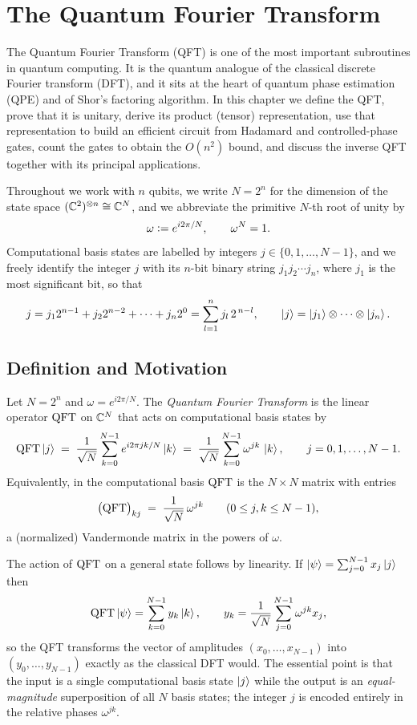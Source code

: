\chapter{The Quantum Fourier Transform}

The Quantum Fourier Transform (QFT) is one of the most important subroutines in
quantum computing. It is the quantum analogue of the classical discrete Fourier
transform (DFT), and it sits at the heart of quantum phase estimation (QPE) and
of Shor's factoring algorithm. In this chapter we define the QFT, prove that it
is unitary, derive its product (tensor) representation, use that representation
to build an efficient circuit from Hadamard and controlled-phase gates, count
the gates to obtain the $O(n^2)$ bound, and discuss the inverse QFT together
with its principal applications.

Throughout we work with $n$ qubits, we write $N = 2^n$ for the dimension of the
state space $(\mathbb{C}^2)^{\otimes n}\cong\mathbb{C}^N$, and we abbreviate the primitive
$N$-th root of unity by
\[
  \omega \vcentcolon= e^{i 2\pi / N}, \qquad \omega^N = 1 .
\]
Computational basis states are labelled by integers $j\in\{0,1,\dots,N-1\}$, and
we freely identify the integer $j$ with its $n$-bit binary string
$j_1 j_2 \cdots j_n$, where $j_1$ is the most significant bit, so that
\[
  j = j_1 2^{n-1} + j_2 2^{n-2} + \cdots + j_n 2^{0}
    = \sum_{l=1}^{n} j_l\, 2^{\,n-l},
  \qquad \ket{j} = \ket{j_1}\otimes\cdots\otimes\ket{j_n}.
\]

\section{Definition and Motivation}

\begin{definition}\label{l5:def:qft}
Let $N = 2^n$ and $\omega = e^{i 2\pi / N}$. The \emph{Quantum Fourier
Transform} is the linear operator $\mathrm{QFT}$ on $\mathbb{C}^N$ that acts on computational
basis states by
\[
  \mathrm{QFT}\ket{j} \;=\; \frac{1}{\sqrt N}\sum_{k=0}^{N-1} e^{i 2\pi j k / N}\ket{k}
             \;=\; \frac{1}{\sqrt N}\sum_{k=0}^{N-1} \omega^{jk}\,\ket{k},
  \qquad j = 0,1,\dots,N-1 .
\]
Equivalently, in the computational basis $\mathrm{QFT}$ is the $N\times N$ matrix with
entries
\[
  \bigl(\mathrm{QFT}\bigr)_{kj} \;=\; \frac{1}{\sqrt N}\,\omega^{jk}
  \qquad (0 \le j,k \le N-1),
\]
a (normalized) Vandermonde matrix in the powers of $\omega$.
\end{definition}

The action of $\mathrm{QFT}$ on a general state follows by linearity. If
$\ket{\psi} = \sum_{j=0}^{N-1} x_j \ket{j}$ then
\[
  \mathrm{QFT}\ket{\psi}
    = \sum_{k=0}^{N-1} y_k \ket{k},
  \qquad
  y_k = \frac{1}{\sqrt N}\sum_{j=0}^{N-1} \omega^{jk} x_j ,
\]
so the QFT transforms the vector of amplitudes $(x_0,\dots,x_{N-1})$ into
$(y_0,\dots,y_{N-1})$ exactly as the classical DFT would. The essential point is
that the input is a single computational basis state $\ket{j}$ while the output
is an \emph{equal-magnitude} superposition of all $N$ basis states; the integer
$j$ is encoded entirely in the relative phases $\omega^{jk}$.


